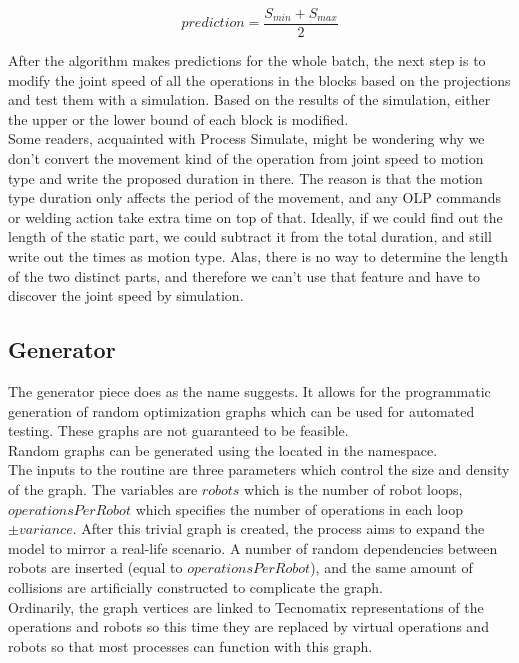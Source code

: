 \begin{equation} \label{eq:BinaryPrediction}
    prediction = \frac{S_{min} + S_{max}}{2}
\end{equation}

After the algorithm makes predictions for the whole batch, the next step is to modify the joint speed of all the operations in the blocks based on the projections and test them with a simulation. Based on the results of the simulation, either the upper or the lower bound of each block is modified. \\

Some readers, acquainted with Process Simulate, might be wondering why we don't convert the movement kind of the operation from joint speed to motion type and write the proposed duration in there. The reason is that the motion type duration only affects the period of the movement, and any OLP commands or welding action take extra time on top of that. Ideally, if we could find out the length of the static part, we could subtract it from the total duration, and still write out the times as motion type. Alas, there is no way to determine the length of the two distinct parts, and therefore we can't use that feature and have to discover the joint speed by simulation. \\

\subsection{Generator}
\label{ch:generator}

The generator piece does as the name suggests. It allows for the programmatic generation of random optimization graphs which can be used for automated testing. These graphs are not guaranteed to be feasible. \\

Random graphs can be generated using the  located in the  namespace. \\

The inputs to the routine are three parameters which control the size and density of the graph. The variables are $robots$ which is the number of robot loops, $operationsPerRobot$ which specifies the number of operations in each loop $\pm variance$. After this trivial graph is created, the process aims to expand the model to mirror a real-life scenario. A number of random dependencies between robots are inserted (equal to $operationsPerRobot$), and the same amount of collisions are artificially constructed to complicate the graph. \\

Ordinarily, the graph vertices are linked to Tecnomatix representations of the operations and robots so this time they are replaced by virtual operations and robots so that most processes can function with this graph. \\